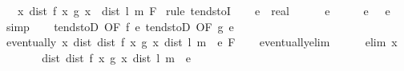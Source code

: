 \begin{isabellebody}
\ \ \ {\isachardoublequoteopen}{\isacharparenleft}{\kern0pt}{\isacharparenleft}{\kern0pt}{\isasymlambda}x{\isachardot}{\kern0pt}\ dist\ {\isacharparenleft}{\kern0pt}f\ x{\isacharparenright}{\kern0pt}\ {\isacharparenleft}{\kern0pt}g\ x{\isacharparenright}{\kern0pt}{\isacharparenright}{\kern0pt}\ {\isasymlonglongrightarrow}\ dist\ l\ m{\isacharparenright}{\kern0pt}\ F{\isachardoublequoteclose}\isanewline
%
\isadelimproof
%
\endisadelimproof
%
\isatagproof
{}\isamarkupfalse%
\ {\isacharparenleft}{\kern0pt}rule\ tendstoI{\isacharparenright}{\kern0pt}\isanewline
\ \ \isamarkupfalse%
\ e\ {\isacharcolon}{\kern0pt}{\isacharcolon}{\kern0pt}\ real\isanewline
\ \ \isamarkupfalse%
\ {\isachardoublequoteopen}{}\ {\isacharless}{\kern0pt}\ e{\isachardoublequoteclose}\isanewline
\ \ \isamarkupfalse%
\ \isamarkupfalse%
\ e{}{\isacharcolon}{\kern0pt}\ {\isachardoublequoteopen}{}\ {\isacharless}{\kern0pt}\ e{\isacharslash}{\kern0pt}{}{\isachardoublequoteclose}\ \isamarkupfalse%
\ simp\isanewline
\ \ \isamarkupfalse%
\ tendstoD\ {\isacharbrackleft}{\kern0pt}OF\ f\ e{}{\isacharbrackright}{\kern0pt}\ tendstoD\ {\isacharbrackleft}{\kern0pt}OF\ g\ e{}{\isacharbrackright}{\kern0pt}\isanewline
\ \ \isamarkupfalse%
\ {\isachardoublequoteopen}eventually\ {\isacharparenleft}{\kern0pt}{\isasymlambda}x{\isachardot}{\kern0pt}\ dist\ {\isacharparenleft}{\kern0pt}dist\ {\isacharparenleft}{\kern0pt}f\ x{\isacharparenright}{\kern0pt}\ {\isacharparenleft}{\kern0pt}g\ x{\isacharparenright}{\kern0pt}{\isacharparenright}{\kern0pt}\ {\isacharparenleft}{\kern0pt}dist\ l\ m{\isacharparenright}{\kern0pt}\ {\isacharless}{\kern0pt}\ e{\isacharparenright}{\kern0pt}\ F{\isachardoublequoteclose}\isanewline
\ \ \isamarkupfalse%
\ {\isacharparenleft}{\kern0pt}eventually{\isacharunderscore}{\kern0pt}elim{\isacharparenright}{\kern0pt}\isanewline
\ \ \ \ \isamarkupfalse%
\ {\isacharparenleft}{\kern0pt}elim\ x{\isacharparenright}{\kern0pt}\isanewline
\ \ \ \ \isamarkupfalse%
\ \isamarkupfalse%
\ {\isachardoublequoteopen}dist\ {\isacharparenleft}{\kern0pt}dist\ {\isacharparenleft}{\kern0pt}f\ x{\isacharparenright}{\kern0pt}\ {\isacharparenleft}{\kern0pt}g\ x{\isacharparenright}{\kern0pt}{\isacharparenright}{\kern0pt}\ {\isacharparenleft}{\kern0pt}dist\ l\ m{\isacharparenright}{\kern0pt}\ {\isacharless}{\kern0pt}\ e{\isachardoublequoteclose}\isanewline

\end{isabellebody}
